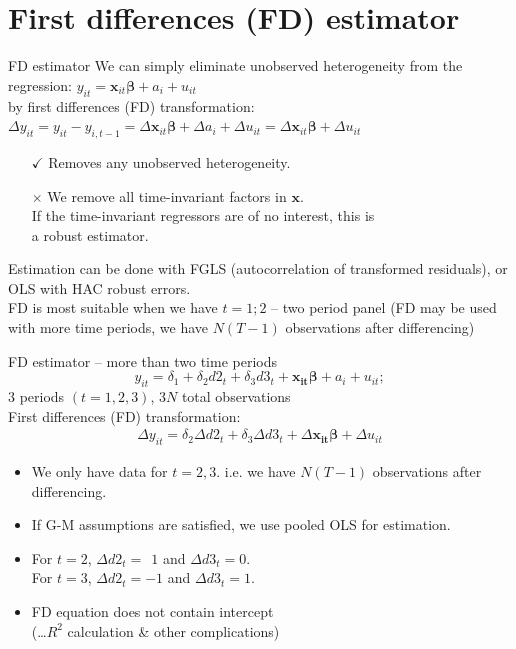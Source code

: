 \documentclass[usenames,dvipsnames]{beamer}
\begin{document}
\section{First differences (FD) estimator}
\begin{frame}{FD estimator}
We can simply eliminate unobserved heterogeneity from the regression: \quad $y_{it} = \bm{x}_{it} \bm{\beta} + a_i + u_{it}$ \\
by first differences (FD) transformation: \\
$\Delta y_{it} = y_{it} - y_{i,t-1} = \Delta \bm{x}_{it} \bm{\beta} + \Delta a_i + \Delta u_{it} = \Delta \bm{x}_{it} \bm{\beta} + \Delta u_{it}$
\begin{itemize}
\item[$\checkmark$] Removes any unobserved heterogeneity.
\item[$\times$] We remove all time-invariant factors in $\bm{x}$.\\
If the time-invariant regressors are of no interest, this is \\a robust estimator.
\end{itemize}
Estimation can be done with FGLS (autocorrelation of transformed residuals), or OLS with HAC robust errors. \\
\medskip
FD is most suitable when we have $t = 1; 2$ – two period panel (FD may be used with more time periods, we have $N(T-1)$ observations after differencing)
\end{frame}
\begin{frame}{FD estimator – more than two time periods}
$$y_{it} = \delta_1 + \delta_2 d2_t + \delta_3 d3_t + \bm{x_{it} \beta} + a_i + u_{it};$$
\hfill $3$ periods $(t=1,2,3)$, $3N$ total observations\\
\medskip
First differences (FD) transformation: 
\begin{align}
\label{eq:one}
\Delta y_{it} = \delta_2 \Delta d2_t + \delta_3 \Delta d3_t + \Delta \bm{x_{it} \beta} + \Delta u_{it}
\end{align}
\begin{itemize}
\item We only have data for $t = 2,3$. i.e. we have $N(T-1)$ observations after differencing.
\item If G-M assumptions are satisfied, we use pooled OLS for estimation.
\item For $t = 2$, $\Delta d2_t = ~~1$ and $\Delta d3_t = 0$. \\For $t=3$, $\Delta d2_t = -1$ and $\Delta d3_t = 1$. 
\item FD equation does not contain intercept \\(\dots $R^2$ calculation \& other complications)
\end{itemize}
\bigskip
\end{frame}
\end{document}
